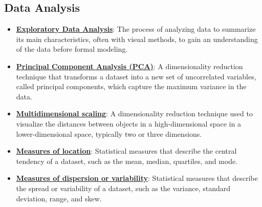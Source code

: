 \documentclass{article}%
\begin{document}
\subsection{Data Analysis}%
\label{subsec:DataAnalysis}%
\begin{itemize}[leftmargin=*]%
\item \href{https://purdue.brightspace.com/d2l/common/assets/pdfjs-d2l-dist/1.0.14-legacy/web/viewer.html?file=\%2Fcontent\%2Fenforced\%2F1095465-WL.202510.CS24200.LE1\%2F10L2-Vis.pdf\%3Fou\%3D1095465\&lang=en-us\&container=d2l-fileviewer-rendered-pdf\&fullscreen=d2l-fileviewer-rendered-pdf-dialog\&height=667#page=3}{\textbf{Exploratory Data Analysis}}: The process of analyzing data to summarize its main characteristics, often with visual methods, to gain an understanding of the data before formal modeling.%
\item \href{https://purdue.brightspace.com/d2l/common/assets/pdfjs-d2l-dist/1.0.14-legacy/web/viewer.html?file=\%2Fcontent\%2Fenforced\%2F1095465-WL.202510.CS24200.LE1\%2F10L2-Vis.pdf\%3Fou\%3D1095465\&lang=en-us\&container=d2l-fileviewer-rendered-pdf\&fullscreen=d2l-fileviewer-rendered-pdf-dialog\&height=667#page=4}{\textbf{Principal Component Analysis (PCA)}}: A dimensionality reduction technique that transforms a dataset into a new set of uncorrelated variables, called principal components, which capture the maximum variance in the data.%
\item \href{https://purdue.brightspace.com/d2l/common/assets/pdfjs-d2l-dist/1.0.14-legacy/web/viewer.html?file=\%2Fcontent\%2Fenforced\%2F1095465-WL.202510.CS24200.LE1\%2F10L2-Vis.pdf\%3Fou\%3D1095465\&lang=en-us\&container=d2l-fileviewer-rendered-pdf\&fullscreen=d2l-fileviewer-rendered-pdf-dialog\&height=667#page=4}{\textbf{Multidimensional scaling}}: A dimensionality reduction technique used to visualize the distances between objects in a high-dimensional space in a lower-dimensional space, typically two or three dimensions.%
\item \href{https://purdue.brightspace.com/d2l/common/assets/pdfjs-d2l-dist/1.0.14-legacy/web/viewer.html?file=\%2Fcontent\%2Fenforced\%2F1095465-WL.202510.CS24200.LE1\%2F10L2-Vis.pdf\%3Fou\%3D1095465\&lang=en-us\&container=d2l-fileviewer-rendered-pdf\&fullscreen=d2l-fileviewer-rendered-pdf-dialog\&height=667#page=5}{\textbf{Measures of location}}: Statistical measures that describe the central tendency of a dataset, such as the mean, median, quartiles, and mode.%
\item \href{https://purdue.brightspace.com/d2l/common/assets/pdfjs-d2l-dist/1.0.14-legacy/web/viewer.html?file=\%2Fcontent\%2Fenforced\%2F1095465-WL.202510.CS24200.LE1\%2F10L2-Vis.pdf\%3Fou\%3D1095465\&lang=en-us\&container=d2l-fileviewer-rendered-pdf\&fullscreen=d2l-fileviewer-rendered-pdf-dialog\&height=667#page=5}{\textbf{Measures of dispersion or variability}}: Statistical measures that describe the spread or variability of a dataset, such as the variance, standard deviation, range, and skew.%

\end{itemize}
\end{document}

